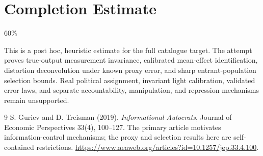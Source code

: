 \documentclass[11pt,a4paper]{article}
\begin{document}
\section{Completion Estimate}
60\%

This is a post hoc, heuristic estimate for the full catalogue target.
The attempt proves true-output measurement invariance, calibrated mean-effect identification, distortion deconvolution under known proxy error, and sharp entrant-population selection bounds. Real political assignment, invariant light calibration, validated error laws, and separate accountability, manipulation, and repression mechanisms remain unsupported.

\begin{thebibliography}{9}
 S. Guriev and D. Treisman (2019).
\emph{Informational Autocrats}, Journal of Economic Perspectives 33(4), 100--127.
The primary article motivates information-control mechanisms; the proxy and selection results here are self-contained restrictions.
\url{https://www.aeaweb.org/articles?id=10.1257/jep.33.4.100}.
\end{thebibliography}
\end{document}
